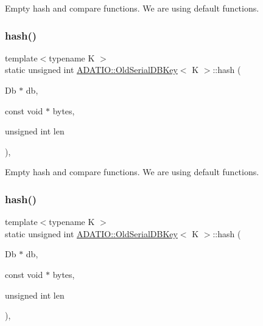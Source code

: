 Empty hash and compare functions. We are using default functions. \mbox{\label{classADATIO_1_1OldSerialDBKey_a35cfd22922a3cd984d6a68cce998565f}} 
\subsubsection{\texorpdfstring{hash()}{hash()}\hspace{0.1cm}{\footnotesize\ttfamily [2/3]}}
{\footnotesize\ttfamily template$<$typename K $>$ \\
static unsigned int \mbox{\hyperlink{classADATIO_1_1OldSerialDBKey}{A\+D\+A\+T\+I\+O\+::\+Old\+Serial\+D\+B\+Key}}$<$ K $>$\+::hash (\begin{DoxyParamCaption}\item[{Db $\ast$}]{db,  }\item[{const void $\ast$}]{bytes,  }\item[{unsigned int}]{len }\end{DoxyParamCaption})\hspace{0.3cm}{\ttfamily [inline]}, {\ttfamily [static]}}

Empty hash and compare functions. We are using default functions. \mbox{\label{classADATIO_1_1OldSerialDBKey_a35cfd22922a3cd984d6a68cce998565f}} 
\subsubsection{\texorpdfstring{hash()}{hash()}\hspace{0.1cm}{\footnotesize\ttfamily [3/3]}}
{\footnotesize\ttfamily template$<$typename K $>$ \\
static unsigned int \mbox{\hyperlink{classADATIO_1_1OldSerialDBKey}{A\+D\+A\+T\+I\+O\+::\+Old\+Serial\+D\+B\+Key}}$<$ K $>$\+::hash (\begin{DoxyParamCaption}\item[{Db $\ast$}]{db,  }\item[{const void $\ast$}]{bytes,  }\item[{unsigned int}]{len }\end{DoxyParamCaption})\hspace{0.3cm}{\ttfamily [inline]}, {\ttfamily [static]}}


